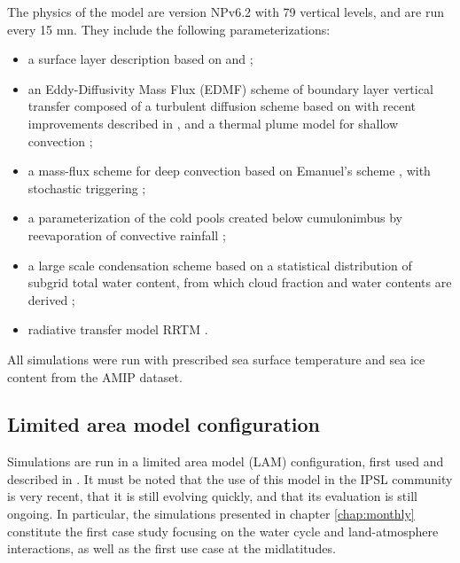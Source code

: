 The physics of the model are version NPv6.2 with 79 vertical levels, and are run every 15 mn.
They include the following parameterizations:
\begin{itemize}
    \item a surface layer description based on \cite{louis_parametric_1979} and \cite{king_sensitivity_2001}; 
    \item an Eddy-Diffusivity Mass Flux (EDMF) scheme of boundary layer vertical transfer composed of a turbulent diffusion scheme based on \cite{yamada_simulations_1983} with recent improvements described in \cite{vignon_modeling_2018}, and a thermal plume model for shallow convection \citep{rio_thermal_2008, hourdin_unified_2019}; 
    \item a mass-flux scheme for deep convection based on Emanuel's scheme \citep{emanuel_scheme_1991, grandpeix_improved_2004, rio_control_2013}, with stochastic triggering \citep{rochetin_deep_2014, rochetin_deep_2014-1}; 
    \item a parameterization of the cold pools created below cumulonimbus by reevaporation of convective rainfall \citep{grandpeix_density_2010-1,grandpeix_density_2010};
    \item a large scale condensation scheme based on a statistical distribution of subgrid total water content, from which cloud fraction and water contents are derived \citep{madeleine_improved_2020}; 
    \item radiative transfer model RRTM \citep{mlawer_radiative_1997}.
\end{itemize}

All simulations were run with prescribed sea surface temperature and sea ice content from the AMIP dataset.

\subsection{Limited area model configuration}
Simulations are run in a limited area model (LAM) configuration, first used and described in \citet{raillard_leveraging_2024}. It must be noted that the use of this model in the IPSL community is very recent, that it is still evolving quickly, and that its evaluation is still ongoing. In particular, the simulations presented in chapter \ref{chap:monthly} constitute the first case study focusing on the water cycle and land-atmosphere interactions, as well as the first use case at the midlatitudes.

